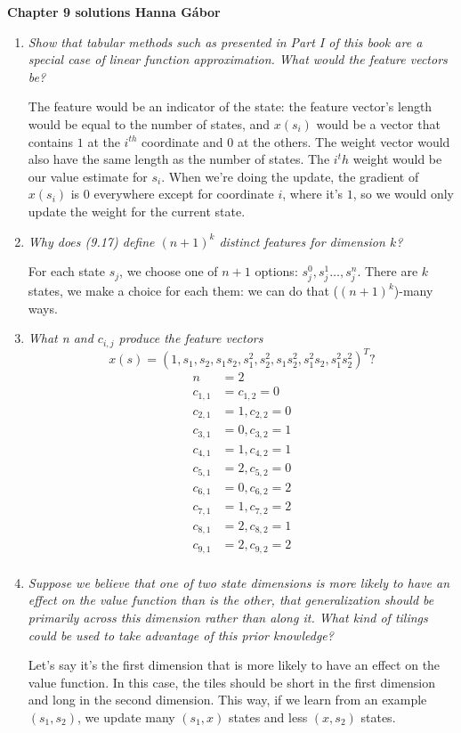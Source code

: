 \documentclass[12pt,a4paper]{article}
\begin{document}
\textbf{Chapter 9 solutions  \hfill Hanna Gábor}

\begin{enumerate}
  \item \textit{Show that tabular methods such as presented in Part I of this book are a
    special case of linear function approximation. What would the feature vectors be?}
    
    The feature would be an indicator of the state: the feature vector's length would be
    equal to the number of states, and $x(s_i)$ would be a vector that contains $1$ at
    the $i^{th}$ coordinate and $0$ at the others. The weight vector would also have
    the same length as the number of states. The $i^th$ weight would be our value estimate
    for $s_i$. When we're doing the update, the gradient of $x(s_i)$ is $0$ everywhere except
    for coordinate $i$, where it's $1$, so we would only update the weight for the current state.
    
  \item \textit{Why does (9.17) define $(n + 1)^k$ distinct features for dimension $k$?}
    
    For each state $s_j$, we choose one of $n + 1$ options: $s_j^0, s_j^1 \dots, s_j^n$.
    There are $k$ states, we make a choice for each them: we can do that ($(n + 1)^k$)-many
    ways.

  \item \textit{What n and $c_{i,j}$ produce the feature vectors
    \[x(s) = (1, s_1, s_2, s_1s_2, s_1^2, s_2^2, s_1s_2^2, s_1^2s_2, s_1^2s_2^2)^T?\]}
    \vspace{-1cm}
    \begin{align*}
    n &= 2 \\
    c_{1, 1} &= c_{1, 2} = 0\\
    c_{2, 1} &= 1, c_{2, 2} = 0\\
    c_{3, 1} &= 0, c_{3, 2} = 1\\
    c_{4, 1} &= 1, c_{4, 2} = 1\\
    c_{5, 1} &= 2, c_{5, 2} = 0\\
    c_{6, 1} &= 0, c_{6, 2} = 2\\
    c_{7, 1} &= 1, c_{7, 2} = 2\\
    c_{8, 1} &= 2, c_{8, 2} = 1\\
    c_{9, 1} &= 2, c_{9, 2} = 2\\
    \end{align*}
  
  \item \textit{Suppose we believe that one of two state dimensions is more likely to have
  an effect on the value function than is the other, that generalization should be primarily
  across this dimension rather than along it. What kind of tilings could be used to take
  advantage of this prior knowledge?}

  Let's say it's the first dimension that is more likely to have an effect on the value
  function. In this case, the tiles should be short in the first dimension and long in
  the second dimension. This way, if we learn from an example $(s_1, s_2)$, we update
  many $(s_1, x)$ states and less $(x, s_2)$ states.
\end{enumerate}
\end{document}
